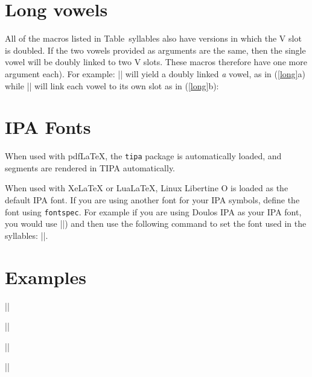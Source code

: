 \documentclass[11pt]{article}
\newcommand*{\pkg}[1]{\texttt{#1}\xspace}
\begin{document}
{\section{Long vowels}
All of the macros listed in Table~{syllables} also have versions in which the V slot is doubled. If the two vowels provided as arguments are the same, then the single vowel will be doubly linked to two V slots. These macros therefore have one more argument each). For example: || will yield a doubly linked \emph{a} vowel, as in (\ref{long}a)  while || will link each vowel to its own slot as in (\ref{long}b):

\begin{multicols}{2}
\begin{exe}
\ex\label{long}
\begin{xlist}
\ex {}
\ex {}
\end{xlist}
\end{exe}
\end{multicols}

\section{IPA Fonts}
When used with pdfLaTeX, the \pkg{tipa} package is automatically loaded, and segments are rendered in TIPA automatically.

When used with XeLaTeX or LuaLaTeX, Linux Libertine O is loaded as the default IPA font. If you are using another font for your IPA symbols, define the font using \pkg{fontspec}.  For example if you are using Doulos IPA as your IPA font, you would use  |\newfontfamily{}|) and then use the following command to set the font used in the syllables: |\setIPAfont{\myipafont}|.


\section{Examples}
\begin{multicols}{3}
||


||


||

\end{multicols}
\begin{multicols}{3}
||



\end{multicols}}
\end{document}
